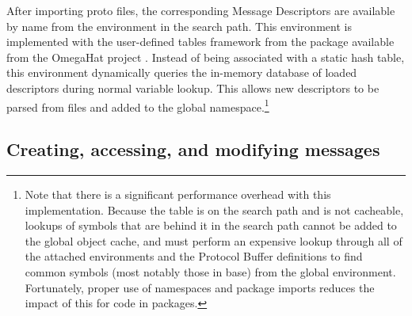 \documentclass[article]{jss}
\begin{document}
After importing proto files, the corresponding Message Descriptors are
available by name from the  environment
in the  search path.  This environment is implemented with
the user-defined tables framework from the  package
available from the OmegaHat project \citep{RObjectTables}.  Instead of
being associated with a static hash table, this environment
dynamically queries the in-memory database of loaded descriptors
during normal variable lookup.  This allows new descriptors to be
parsed from  files and added to the global
namespace.\footnote{Note that there is a significant performance
  overhead with this  implementation.  Because the
  table is on the search path and is not cacheable, lookups of symbols
  that are behind it in the search path cannot be added to the global
  object cache, and  must perform an expensive lookup
  through all of the attached environments and the Protocol Buffer
  definitions to find common symbols (most notably those in base) from
  the global environment.  Fortunately, proper use of namespaces and
  package imports reduces the impact of this for code in packages.}

\subsection{Creating, accessing, and modifying messages}
\end{document}
